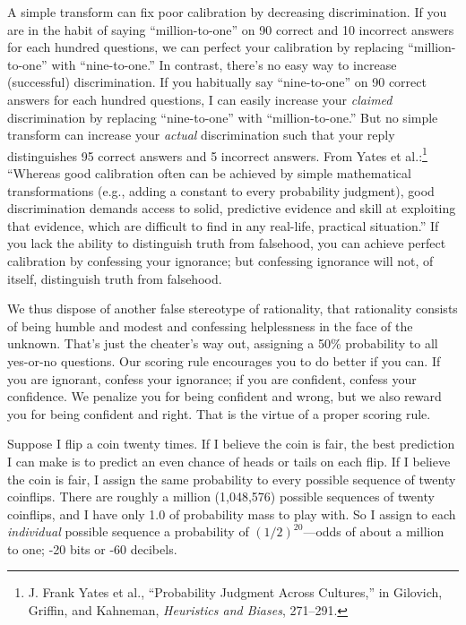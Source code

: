 {
 A simple transform can fix poor calibration by decreasing
discrimination. If you are in the habit of saying
``million-to-one'' on 90 correct and
10 incorrect answers for each hundred questions, we can perfect your
calibration by replacing
``million-to-one'' with
``nine-to-one.'' In contrast,
there's no easy way to increase (successful)
discrimination. If you habitually say
``nine-to-one'' on 90 correct
answers for each hundred questions, I can easily increase your
\textit{claimed} discrimination by replacing
``nine-to-one'' with
``million-to-one.'' But no simple
transform can increase your \textit{actual} discrimination such that
your reply distinguishes 95 correct answers and 5 incorrect answers.
From Yates et al.:\footnote{J. Frank Yates et al., ``Probability Judgment
Across Cultures,'' in Gilovich, Griffin, and
Kahneman, \textit{Heuristics and Biases}, 271--291.} ``Whereas good
calibration often can be achieved by simple mathematical
transformations (e.g., adding a constant to every probability
judgment), good discrimination demands access to solid, predictive
evidence and skill at exploiting that evidence, which are difficult to
find in any real-life, practical situation.'' If you
lack the ability to distinguish truth from falsehood, you can achieve
perfect calibration by confessing your ignorance; but confessing
ignorance will not, of itself, distinguish truth from falsehood.}

{
 We thus dispose of another false stereotype of rationality, that
rationality consists of being humble and modest and confessing
helplessness in the face of the unknown. That's just
the cheater's way out, assigning a 50\% probability to
all yes-or-no questions. Our scoring rule encourages you to do better
if you can. If you are ignorant, confess your ignorance; if you are
confident, confess your confidence. We penalize you for being confident
and wrong, but we also reward you for being confident and right. That
is the virtue of a proper scoring rule.}

{
 Suppose I flip a coin twenty times. If I believe the coin is fair,
the best prediction I can make is to predict an even chance of heads or
tails on each flip. If I believe the coin is fair, I assign the same
probability to every possible sequence of twenty coinflips. There are
roughly a million (1,048,576) possible sequences of twenty coinflips,
and I have only 1.0 of probability mass to play with. So I assign to
each \textit{individual} possible sequence a probability of
$(1/2)^{20}$---odds of about a million to one; -20
bits or -60 decibels.}

